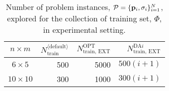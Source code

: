 \begin{table}[t]
\centering
\begin{tabular}{crrr} \toprule
$n \times m$  & $N_{\text{train}}^{\langle \text{default} \rangle}$ 
                     & $N_{\text{train, EXT}}^{\text{OPT}}$ 
                              & $N_{\text{train, EXT}}^{\text{DA}i}$ \\ \midrule
$6\times 5$   & 500  & 5000   & $500(i+1)$ \\
$10\times 10$ & 300  & 1000   & $300(i+1)$ \\
\bottomrule
\end{tabular}
\caption{Number of problem instances, 
$\mathcal{P}=\{\mathbf{p}_i,{\mathbf{\sigma}}_i\}_{i=1}^{N}$, explored for the collection of 
training set, $\Phi$, in experimental setting.}
\label{tbl:Ntrain}
\end{table}